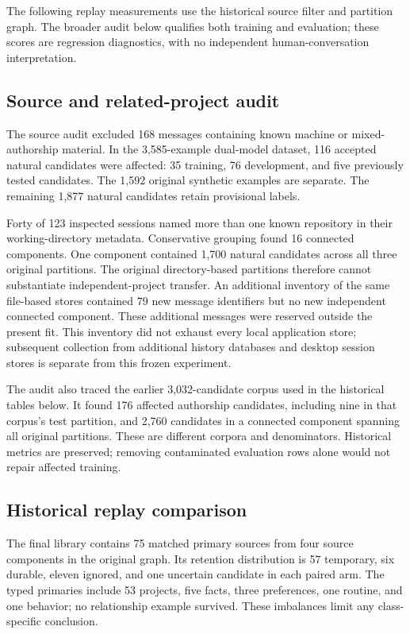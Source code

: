 \noindent The following replay measurements use the historical source filter and partition graph. The broader audit below qualifies both training and evaluation; these scores are regression diagnostics, with no independent human-conversation interpretation.

\subsection{Source and related-project audit}
\label{sec:source-audit}
The source audit excluded 168 messages containing known machine or mixed-authorship material. In the 3,585-example dual-model dataset, 116 accepted natural candidates were affected: 35 training, 76 development, and five previously tested candidates. The 1,592 original synthetic examples are separate. The remaining 1,877 natural candidates retain provisional labels.

Forty of 123 inspected sessions named more than one known repository in their working-directory metadata. Conservative grouping found 16 connected components. One component contained 1,700 natural candidates across all three original partitions. The original directory-based partitions therefore cannot substantiate independent-project transfer. An additional inventory of the same file-based stores contained 79 new message identifiers but no new independent connected component. These additional messages were reserved outside the present fit. This inventory did not exhaust every local application store; subsequent collection from additional history databases and desktop session stores is separate from this frozen experiment.

The audit also traced the earlier 3,032-candidate corpus used in the historical tables below. It found 176 affected authorship candidates, including nine in that corpus's test partition, and 2,760 candidates in a connected component spanning all original partitions. These are different corpora and denominators. Historical metrics are preserved; removing contaminated evaluation rows alone would not repair affected training.

\subsection{Historical replay comparison}
The final library contains 75 matched primary sources from four source components in the original graph. Its retention distribution is 57 temporary, six durable, eleven ignored, and one uncertain candidate in each paired arm. The typed primaries include 53 projects, five facts, three preferences, one routine, and one behavior; no relationship example survived. These imbalances limit any class-specific conclusion.


